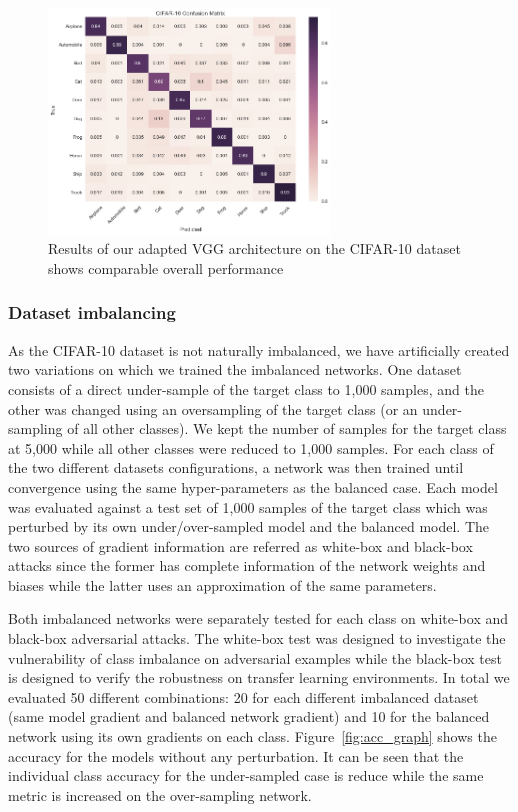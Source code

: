 \documentclass[runningheads,a4paper]{llncs}
\begin{document}
\begin{figure}
	\centering
	\includegraphics[height=6.0cm]{conf_matrix.png}
	\caption{Results of our adapted VGG architecture on the CIFAR-10 dataset shows comparable overall performance}
	\label{fig:conf_matrix_full}
\end{figure}

\subsubsection{Dataset imbalancing} As the CIFAR-10 dataset is not naturally imbalanced, we have artificially created two variations on which we trained the imbalanced networks.  One dataset consists of a direct under-sample of the target class to 1,000 samples, and the other was changed using  an oversampling of the target class (or an under-sampling of all other classes). We kept the number of samples for the target class at 5,000 while all other classes were reduced to 1,000 samples. For each class of the two different datasets configurations, a network was then trained until convergence using the same hyper-parameters as the balanced case. Each model was evaluated against a test set of 1,000 samples of the target class which was  perturbed by its own under/over-sampled model and the balanced model. The two sources of gradient information are referred as white-box and black-box attacks since the former has complete information of the network weights and biases while the latter uses an approximation of the same parameters. 

Both imbalanced networks were separately tested for each class on white-box and black-box adversarial attacks. The white-box test was designed to investigate the vulnerability of class imbalance on adversarial examples while the black-box test is designed to verify the robustness on transfer learning environments. In total we evaluated 50 different combinations: 20 for each different imbalanced dataset (same model gradient and balanced network gradient) and 10 for the balanced network using its own gradients on each class. Figure~\ref{fig:acc_graph} shows the accuracy for the models without any perturbation. It can be seen that the individual class accuracy for the under-sampled case is reduce while the same metric is increased on the over-sampling network. 
\end{document}
